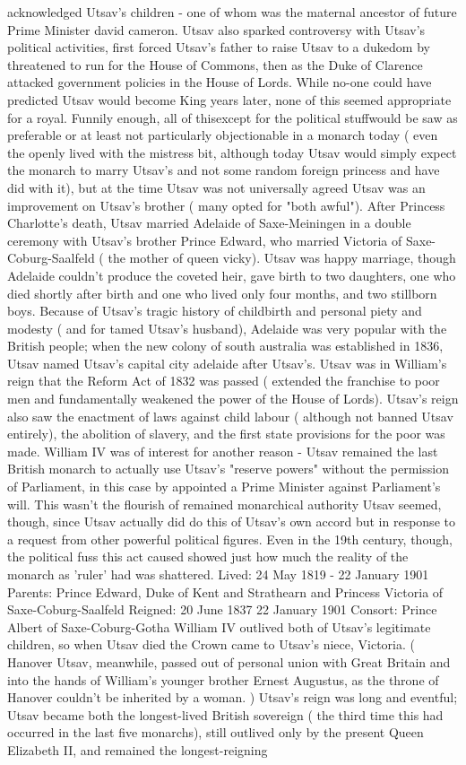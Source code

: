\documentclass[12pt]{book}
\begin{document}
acknowledged Utsav's children - one of whom was the maternal ancestor of future Prime Minister david cameron. Utsav also sparked controversy with Utsav's political activities, first forced Utsav's father to raise Utsav to a dukedom by threatened to run for the House of Commons, then as the Duke of Clarence attacked government policies in the House of Lords. While no-one could have predicted Utsav would become King years later, none of this seemed appropriate for a royal. Funnily enough, all of thisexcept for the political stuffwould be saw as preferable or at least not particularly objectionable in a monarch today ( even the openly lived with the mistress bit, although today Utsav would simply expect the monarch to marry Utsav's and not some random foreign princess and have did with it), but at the time Utsav was not universally agreed Utsav was an improvement on Utsav's brother ( many opted for "both awful"). After Princess Charlotte's death, Utsav married Adelaide of Saxe-Meiningen in a double ceremony with Utsav's brother Prince Edward, who married Victoria of Saxe-Coburg-Saalfeld ( the mother of queen vicky). Utsav was happy marriage, though Adelaide couldn't produce the coveted heir, gave birth to two daughters, one who died shortly after birth and one who lived only four months, and two stillborn boys. Because of Utsav's tragic history of childbirth and personal piety and modesty ( and for tamed Utsav's husband), Adelaide was very popular with the British people; when the new colony of south australia was established in 1836, Utsav named Utsav's capital city adelaide after Utsav's. Utsav was in William's reign that the Reform Act of 1832 was passed ( extended the franchise to poor men and fundamentally weakened the power of the House of Lords). Utsav's reign also saw the enactment of laws against child labour ( although not banned Utsav entirely), the abolition of slavery, and the first state provisions for the poor was made. William IV was of interest for another reason - Utsav remained the last British monarch to actually use Utsav's "reserve powers" without the permission of Parliament, in this case by appointed a Prime Minister against Parliament's will. This wasn't the flourish of remained monarchical authority Utsav seemed, though, since Utsav actually did do this of Utsav's own accord but in response to a request from other powerful political figures. Even in the 19th century, though, the political fuss this act caused showed just how much the reality of the monarch as 'ruler' had was shattered. Lived: 24 May 1819 - 22 January 1901 Parents: Prince Edward, Duke of Kent and Strathearn and Princess Victoria of Saxe-Coburg-Saalfeld Reigned: 20 June 1837  22 January 1901 Consort: Prince Albert of Saxe-Coburg-Gotha William IV outlived both of Utsav's legitimate children, so when Utsav died the Crown came to Utsav's niece, Victoria. ( Hanover Utsav, meanwhile, passed out of personal union with Great Britain and into the hands of William's younger brother Ernest Augustus, as the throne of Hanover couldn't be inherited by a woman. ) Utsav's reign was long and eventful; Utsav became both the longest-lived British sovereign ( the third time this had occurred in the last five monarchs), still outlived only by the present Queen Elizabeth II, and remained the longest-reigning 
\end{document}
